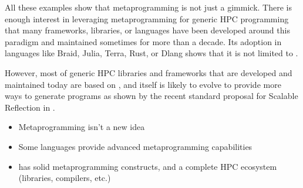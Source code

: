 \documentclass[../main]{subfiles}
\begin{document}
All these examples show that metaprogramming is not just a gimmick.
There is enough interest in leveraging metaprogramming
for generic HPC programming that many frameworks, libraries, or languages
have been developed around this paradigm and maintained sometimes
for more than a decade. Its adoption in languages like Braid, Julia, Terra,
Rust, or Dlang shows that it is not limited to \cpp.

However, most of generic HPC libraries and frameworks that are developed
and maintained today are based on \cpp, and \cpp itself is likely to
evolve to provide more ways to generate programs as shown by the recent
standard proposal for Scalable Reflection in \cpp \cite{scalable-reflection}.

\begin{itemize}
\item Metaprogramming isn't a new idea

\item Some languages provide advanced metaprogramming capabilities

\item \cpp has solid metaprogramming constructs, and a complete HPC ecosystem
(libraries, compilers, etc.)
\end{itemize}
\end{document}
